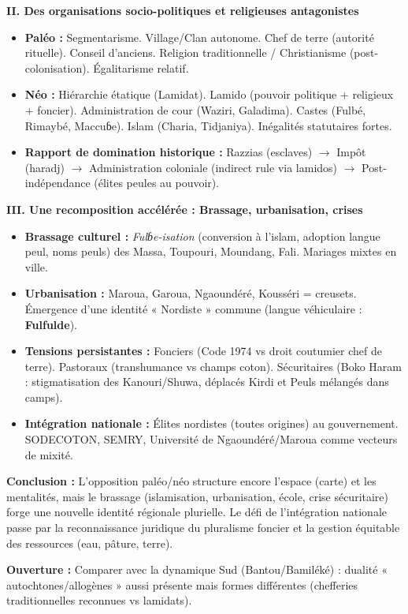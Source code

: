 \documentclass[11pt]{article}
\begin{document}
\begin{exoresolu}
\textbf{II. Des organisations socio-politiques et religieuses antagonistes}
\begin{itemize}
    \item \textbf{Paléo :} Segmentarisme. Village/Clan autonome. Chef de terre (autorité rituelle). Conseil d'anciens. Religion traditionnelle / Christianisme (post-colonisation). Égalitarisme relatif.
    \item \textbf{Néo :} Hiérarchie étatique (Lamidat). Lamido (pouvoir politique + religieux + foncier). Administration de cour (Waziri, Galadima). Castes (Fulbé, Rimaybé, Maccuɓe). Islam (Charia, Tidjaniya). Inégalités statutaires fortes.
    \item \textbf{Rapport de domination historique :} Razzias (esclaves) $\rightarrow$ Impôt (haradj) $\rightarrow$ Administration coloniale (indirect rule via lamidos) $\rightarrow$ Post-indépendance (élites peules au pouvoir).
\end{itemize}

\textbf{III. Une recomposition accélérée : Brassage, urbanisation, crises}
\begin{itemize}
    \item \textbf{Brassage culturel :} \emph{Fulɓe-isation} (conversion à l'islam, adoption langue peul, noms peuls) des Massa, Toupouri, Moundang, Fali. Mariages mixtes en ville.
    \item \textbf{Urbanisation :} Maroua, Garoua, Ngaoundéré, Kousséri = creusets. Émergence d'une identité « Nordiste » commune (langue véhiculaire : \textbf{Fulfulde}).
    \item \textbf{Tensions persistantes :} Fonciers (Code 1974 vs droit coutumier chef de terre). Pastoraux (transhumance vs champs coton). Sécuritaires (Boko Haram : stigmatisation des Kanouri/Shuwa, déplacés Kirdi et Peuls mélangés dans camps).
    \item \textbf{Intégration nationale :} Élites nordistes (toutes origines) au gouvernement. SODECOTON, SEMRY, Université de Ngaoundéré/Maroua comme vecteurs de mixité.
\end{itemize}

\textbf{Conclusion :}
L'opposition paléo/néo structure encore l'espace (carte) et les mentalités, mais le brassage (islamisation, urbanisation, école, crise sécuritaire) forge une nouvelle identité régionale plurielle. Le défi de l'intégration nationale passe par la reconnaissance juridique du pluralisme foncier et la gestion équitable des ressources (eau, pâture, terre).

\textbf{Ouverture :} Comparer avec la dynamique Sud (Bantou/Bamiléké) : dualité « autochtones/allogènes » aussi présente mais formes différentes (chefferies traditionnelles reconnues vs lamidats).
\end{exoresolu}
\end{document}
